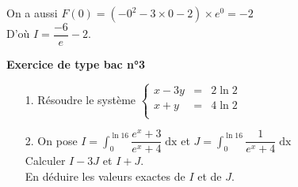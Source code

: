 On a aussi $F\left(0\right) = \left(-0^2 - 3 \times 0 - 2\right)\times e^0 = -2$ \\

D'où $I = \dfrac{-6}{e} - 2$. 

\vspace*{-5cm}

\newpage

\vspace*{-1.3cm}

\textbf{Exercice de type bac n°3} \\

\begin{itemize}
\item[1.] Résoudre le système $\left\{
  \begin{array}{rll}
    x-3y & = & 2\ln 2 \\
    x+y & = & 4\ln 2 \\
  \end{array}
\right.$
\vspace*{.3cm}
\item[2.] On pose $I = \displaystyle \int_0^{\ln 16} \dfrac{e^x + 3}{e^x + 4} \; \mathrm{dx}$ et $J = \displaystyle \int_0^{\ln 16} \dfrac{1}{e^x + 4} \; \mathrm{dx}$ \vspace*{.3cm} \\ Calculer $I - 3J$ et $I+J$. \vspace*{.3cm} \\ En déduire les valeurs exactes de $I$ et de $J$. \\
\end{itemize}

\vspace*{.3cm}

